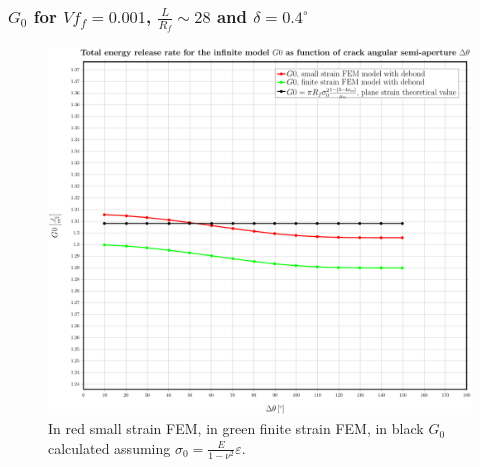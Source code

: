 \documentclass[first,firstsupp,lastsupp,handout,last,hyperref,table]{ETHclass}
\begin{document}
\begin{frame}
\frametitle{\small $G_{0}$ for $Vf_{f}=0.001$, $\frac{L}{R_{f}}\sim28$ and $\delta=0.4^{\circ}$}
\vspace{-0.5cm}
\centering
\captionsetup[figure]{font=scriptsize,labelfont=scriptsize}
\begin{figure}[!h]
\centering
\includegraphics[height=0.7\textheight]{2017-06-23_AbqRunSummary_SingleFiberEqRfSmallFiniteStrain_G0_Summary.pdf}
  \caption{\scriptsize In red small strain FEM, in green finite strain FEM, in black $G_{0}$ calculated assuming $\sigma_{0}=\frac{E}{1-\nu^{2}}\varepsilon$.}
  \label{fig:res1}
\end{figure}
\end{frame}
\end{document}
